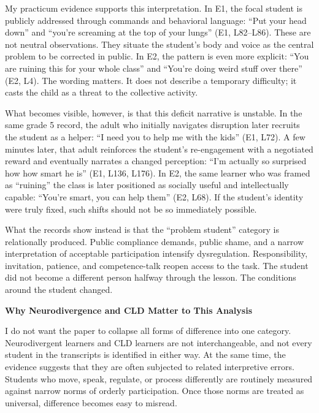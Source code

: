\documentclass[12pt]{article}
\newcommand{\levelone}[1]{\begin{center}\textbf{#1}\end{center}}
\newcommand{\EvidenceSet}[1]{\textsc{E#1}}
\begin{document}
My practicum evidence supports this interpretation. In \EvidenceSet{1}, the focal student is publicly addressed through commands and behavioral language: ``Put your head down'' and ``you're screaming at the top of your lungs'' (\EvidenceSet{1}, L82--L86). These are not neutral observations. They situate the student's body and voice as the central problem to be corrected in public. In \EvidenceSet{2}, the pattern is even more explicit: ``You are ruining this for your whole class'' and ``You're doing weird stuff over there'' (\EvidenceSet{2}, L4). The wording matters. It does not describe a temporary difficulty; it casts the child as a threat to the collective activity.

What becomes visible, however, is that this deficit narrative is unstable. In the same grade 5 record, the adult who initially navigates disruption later recruits the student as a helper: ``I need you to help me with the kids'' (\EvidenceSet{1}, L72). A few minutes later, that adult reinforces the student's re-engagement with a negotiated reward and eventually narrates a changed perception: ``I'm actually so surprised how how smart he is'' (\EvidenceSet{1}, L136, L176). In \EvidenceSet{2}, the same learner who was framed as ``ruining'' the class is later positioned as socially useful and intellectually capable: ``You're smart, you can help them'' (\EvidenceSet{2}, L68). If the student's identity were truly fixed, such shifts should not be so immediately possible.

What the records show instead is that the ``problem student'' category is relationally produced. Public compliance demands, public shame, and a narrow interpretation of acceptable participation intensify dysregulation. Responsibility, invitation, patience, and competence-talk reopen access to the task. The student did not become a different person halfway through the lesson. The conditions around the student changed.

\levelone{Why Neurodivergence and CLD Matter to This Analysis}

I do not want the paper to collapse all forms of difference into one category. Neurodivergent learners and CLD learners are not interchangeable, and not every student in the transcripts is identified in either way. At the same time, the evidence suggests that they are often subjected to related interpretive errors. Students who move, speak, regulate, or process differently are routinely measured against narrow norms of orderly participation. Once those norms are treated as universal, difference becomes easy to misread.
\end{document}
